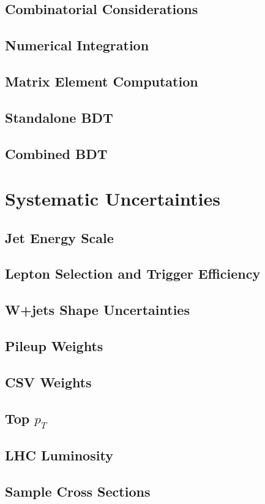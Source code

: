 \subsection{Combinatorial Considerations}
\subsection{Numerical Integration}
\subsection{Matrix Element Computation}
\subsection{Standalone BDT}
\subsection{Combined BDT}

\section{Systematic Uncertainties}
\subsection{Jet Energy Scale}
\subsection{Lepton Selection and Trigger Efficiency}
\subsection{W+jets Shape Uncertainties}
\subsection{Pileup Weights}
\subsection{CSV Weights}
\subsection{Top $p_{T}$}
\subsection{LHC Luminosity}
\subsection{Sample Cross Sections}
